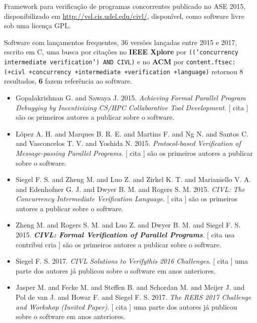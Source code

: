 Framework para verificação de programas concorrentes
publicado no ASE 2015,
disponibilizado em \url{http://vsl.cis.udel.edu/civl/},
disponível,
como software livre
sob uma licença GPL.

Software com lançamentos frequentes,
36 versões lançadas
entre 2015 e 2017,
escrito em C,
uma busca por citações no {\bf IEEE Xplore} por
\texttt{(('concurrency intermediate verification') AND CIVL)}
e no {\bf ACM} por
\texttt{content.ftsec:(+civl +concurrency +intermediate +verification +language)}
retornou
8 resultados,
{\bf 6} fazem referência ao software.

\begin{itemize}
\item Gopalakrishnan G. and Sawaya J.
      2015.
        \textit{ Achieving Formal Parallel Program Debugging by Incentivizing CS/HPC Collaborative Tool Development}.
      [
          cita
      ]
são os primeiros autores a publicar sobre o software.
\item L\'{o}pez A. H. and Marques B. R. E. and Martins F. and Ng N. and Santos C. and Vasconcelos T. V. and Yoshida N.
      2015.
        \textit{ Protocol-based Verification of Message-passing Parallel Programs}.
      [
          cita
      ]
são os primeiros autores a publicar sobre o software.
\item Siegel F. S. and Zheng M. and Luo Z. and Zirkel K. T. and Marianiello V. A. and Edenhofner G. J. and Dwyer B. M. and Rogers S. M.
      2015.
        \textit{ CIVL: The Concurrency Intermediate Verification Language}.
      [
          cita
      ]
são os primeiros autores a publicar sobre o software.
\item Zheng M. and Rogers S. M. and Luo Z. and Dwyer B. M. and Siegel F. S.
      2015.
        \textbf{\textit{ CIVL: Formal Verification of Parallel Programs}}.
      [
          cita
          usa
          contribui
          cria
      ]
são os primeiros autores a publicar sobre o software.
\item Siegel F. S.
      2017.
        \textit{ CIVL Solutions to Verifythis 2016 Challenges}.
      [
          cita
      ]
uma parte dos autores já publicou sobre o software em anos anteriores.
\item Jasper M. and Fecke M. and Steffen B. and Schordan M. and Meijer J. and Pol de van J. and Howar F. and Siegel F. S.
      2017.
        \textit{ The RERS 2017 Challenge and Workshop (Invited Paper)}.
      [
          cita
      ]
uma parte dos autores já publicou sobre o software em anos anteriores.
\end{itemize}
